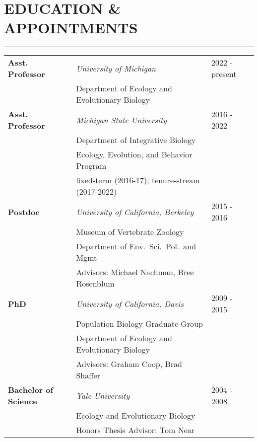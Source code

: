 \documentclass{gbcv}
\begin{document}
\section*{EDUCATION \& APPOINTMENTS}
\vspace{-0.6cm}
\rule{470pt}{0.4pt}
%
\begin{tabular}{p{} p{} p{}} 
\\
\rule{0pt}{4ex}\:\bf{Asst. Professor} & \it{University of Michigan} & \hfill 2022 - present\\
 & \hspace{0.5cm}Department of Ecology and Evolutionary Biology & \\
%
\rule{0pt}{4ex}
%
\bf{Asst. Professor} & \it{Michigan State University} & \hfill 2016 - 2022\\
 & \hspace{0.5cm}Department of Integrative Biology & \\
 & \hspace{0.5cm}Ecology, Evolution, and Behavior Program& \\
  & \hspace{0.5cm}fixed-term (2016-17); tenure-stream (2017-2022)& \\
%
\rule{0pt}{4ex}
%
\bf{Postdoc} & \it{University of California, Berkeley} & \hfill 2015 - 2016\\
 & \hspace{0.5cm}Museum of Vertebrate Zoology & \\
 & \hspace{0.5cm}Department of Env.\ Sci.\ Pol.\ and Mgmt& \\
 & \hspace{0.5cm}Advisors: Michael Nachman, Bree Rosenblum & \\ 
%
\rule{0pt}{4ex}
%
\bf{PhD} & \it{University of California, Davis}  & \hfill 2009 - 2015\\
 & \hspace{0.5cm}Population Biology Graduate Group & \\
 & \hspace{0.5cm}Department of Ecology and Evolutionary Biology & \\
 & \hspace{0.5cm}Advisors: Graham Coop, Brad Shaffer & \\ 
%
\rule{0pt}{4ex}
%
\textbf{Bachelor of Science} & \it{Yale University} & \hfill 2004 - 2008 \\
& \hspace{0.5cm}Ecology and Evolutionary Biology & \\
& \hspace{0.5cm}Honors Thesis Advisor: Tom Near & \\
\end{tabular}
%
\vspace{0.1cm}
\end{document}
